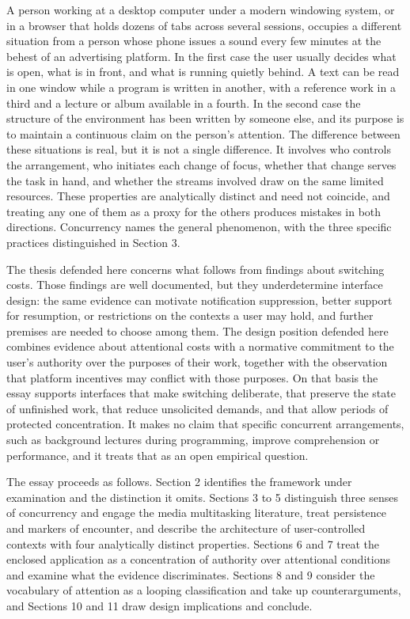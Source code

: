 \documentclass[12pt]{article}
\begin{document}
A person working at a desktop computer under a modern windowing system, or in a browser that holds dozens of tabs across several sessions, occupies a different situation from a person whose phone issues a sound every few minutes at the behest of an advertising platform. In the first case the user usually decides what is open, what is in front, and what is running quietly behind. A text can be read in one window while a program is written in another, with a reference work in a third and a lecture or album available in a fourth. In the second case the structure of the environment has been written by someone else, and its purpose is to maintain a continuous claim on the person's attention. The difference between these situations is real, but it is not a single difference. It involves who controls the arrangement, who initiates each change of focus, whether that change serves the task in hand, and whether the streams involved draw on the same limited resources. These properties are analytically distinct and need not coincide, and treating any one of them as a proxy for the others produces mistakes in both directions. Concurrency names the general phenomenon, with the three specific practices distinguished in Section 3.

The thesis defended here concerns what follows from findings about switching costs. Those findings are well documented, but they underdetermine interface design: the same evidence can motivate notification suppression, better support for resumption, or restrictions on the contexts a user may hold, and further premises are needed to choose among them. The design position defended here combines evidence about attentional costs with a normative commitment to the user's authority over the purposes of their work, together with the observation that platform incentives may conflict with those purposes. On that basis the essay supports interfaces that make switching deliberate, that preserve the state of unfinished work, that reduce unsolicited demands, and that allow periods of protected concentration. It makes no claim that specific concurrent arrangements, such as background lectures during programming, improve comprehension or performance, and it treats that as an open empirical question.

The essay proceeds as follows. Section 2 identifies the framework under examination and the distinction it omits. Sections 3 to 5 distinguish three senses of concurrency and engage the media multitasking literature, treat persistence and markers of encounter, and describe the architecture of user-controlled contexts with four analytically distinct properties. Sections 6 and 7 treat the enclosed application as a concentration of authority over attentional conditions and examine what the evidence discriminates. Sections 8 and 9 consider the vocabulary of attention as a looping classification and take up counterarguments, and Sections 10 and 11 draw design implications and conclude.
\end{document}
